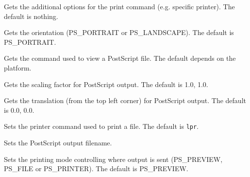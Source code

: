 

Gets the additional options for the print command (e.g. specific printer). The default is nothing.



Gets the orientation (PS\_PORTRAIT or PS\_LANDSCAPE). The default is PS\_PORTRAIT.



Gets the command used to view a PostScript file. The default depends on the platform.



Gets the scaling factor for PostScript output. The default is 1.0, 1.0.



Gets the translation (from the top left corner) for PostScript output. The default is 0.0, 0.0.



Sets the printer command used to print a file. The default is {\tt lpr}.



Sets the PostScript output filename.



Sets the printing mode controlling where output is sent (PS\_PREVIEW, PS\_FILE or PS\_PRINTER).
The default is PS\_PREVIEW.



